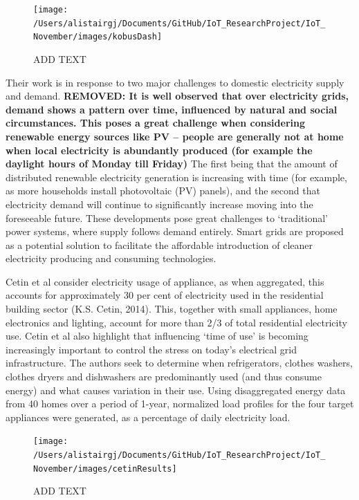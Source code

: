 \documentclass[11pt,]{article}
\begin{document}
\begin{figure}[H]

{\centering \texttt{[image: /Users/alistairgj/Documents/GitHub/IoT\_ResearchProject/IoT\_November/images/kobusDash]} 

}

\caption{ADD TEXT}\label{fig:unnamed-chunk-6}
\end{figure}

Their work is in response to two major challenges to domestic
electricity supply and demand. \textbf{REMOVED: It is well observed that
over electricity grids, demand shows a pattern over time, influenced by
natural and social circumstances. This poses a great challenge when
considering renewable energy sources like PV -- people are generally not
at home when local electricity is abundantly produced (for example the
daylight hours of Monday till Friday)} The first being that the amount
of distributed renewable electricity generation is increasing with time
(for example, as more households install photovoltaic (PV) panels), and
the second that electricity demand will continue to significantly
increase moving into the foreseeable future. These developments pose
great challenges to `traditional' power systems, where supply follows
demand entirely. Smart grids are proposed as a potential solution to
facilitate the affordable introduction of cleaner electricity producing
and consuming technologies.

Cetin et al consider electricity usage of appliance, as when aggregated,
this accounts for approximately 30 per cent of electricity used in the
residential building sector (K.S. Cetin, 2014). This, together with
small appliances, home electronics and lighting, account for more than
2/3 of total residential electricity use. Cetin et al also highlight
that influencing `time of use' is becoming increasingly important to
control the stress on today's electrical grid infrastructure. The
authors seek to determine when refrigerators, clothes washers, clothes
dryers and dishwashers are predominantly used (and thus consume energy)
and what causes variation in their use. Using disaggregated energy data
from 40 homes over a period of 1-year, normalized load profiles for the
four target appliances were generated, as a percentage of daily
electricity load.

\begin{figure}[H]

{\centering \texttt{[image: /Users/alistairgj/Documents/GitHub/IoT\_ResearchProject/IoT\_November/images/cetinResults]} 

}

\caption{ADD TEXT}\label{fig:unnamed-chunk-7}
\end{figure}
\end{document}

